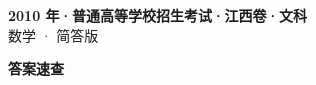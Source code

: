 \documentclass[zihao=-4, a4paper]{ctexart}
\begin{document}
\begin{center}
  {\Large\bfseries 2010 年·普通高等学校招生考试·江西卷·文科}\\[4pt]
  {\large 数学 · 简答版}
\end{center}
\medskip
{}

\clearpage
{}
\begin{center}{\Large\bfseries 答案速查}\end{center}
\medskip

\end{document}
